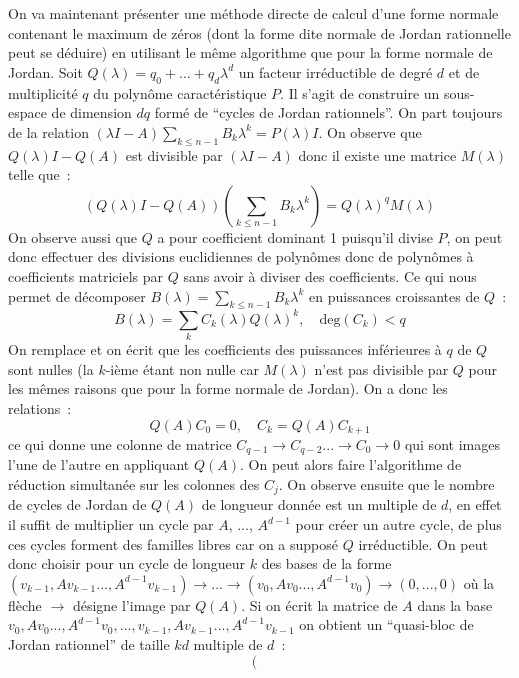 \documentclass[a4paper,11pt]{article}
\begin{document}
\begin{giacjshere}
On va maintenant pr\'esenter une m\'ethode directe de calcul d'une forme normale
contenant le maximum de z\'eros (dont la forme dite normale de Jordan
rationnelle peut se d\'eduire) en utilisant le m\^eme algorithme que pour 
la forme
normale de Jordan. Soit $Q(\lambda)=q_0+...+q_d \lambda^d$ 
un facteur irr\'eductible
de degr\'e $d$ et de multiplicit\'e $q$ 
du polyn\^ome caract\'eristique $P$. Il
s'agit de construire un sous-espace de dimension $dq$ form\'e de ``cycles
de Jordan rationnels''.
On part toujours de la relation 
$(\lambda I -A) \sum_{k\leq n-1} B_k \lambda^k=P(\lambda)I$.
On observe que $Q(\lambda)I-Q(A)$ est divisible par $(\lambda I -A) $
donc il existe une matrice $M(\lambda)$ telle que~:
\[ (Q(\lambda) I -Q(A)) (\sum_{k\leq n-1} B_k \lambda^k)
=Q(\lambda)^q M(\lambda) \]
On observe aussi que $Q$ a pour coefficient dominant 1 puisqu'il divise
$P$, on peut donc effectuer des divisions euclidiennes de polyn\^omes
donc de polyn\^omes \`a coefficients matriciels par $Q$ sans avoir
\`a diviser des coefficients. Ce qui nous
permet de d\'ecomposer $B(\lambda)=\sum_{k\leq n-1} B_k \lambda^k$ en 
puissances croissantes de $Q$~:
\[ B(\lambda)=\sum_k C_k(\lambda) Q(\lambda)^k, \quad \mbox{deg}(C_k)<q \]
On remplace et on \'ecrit que les coefficients des puissances inf\'erieures
\`a $q$ de $Q$ sont nulles (la $k$-i\`eme \'etant non nulle
car $M(\lambda)$ n'est pas divisible par $Q$ pour les m\^emes raisons
que pour la forme normale de Jordan). On a donc les relations~:
\[ Q(A)C_0 = 0, \quad C_k = Q(A) C_{k+1} \]
ce qui donne une colonne de matrice 
$C_{q-1} \rightarrow C_{q-2} ... \rightarrow C_0 \rightarrow 0$
qui sont images l'une de l'autre en appliquant $Q(A)$. On peut alors
faire l'algorithme de r\'eduction simultan\'ee sur les colonnes des $C_j$. 
On observe
ensuite que le nombre de cycles de Jordan de $Q(A)$ de longueur donn\'ee 
est un multiple de $d$, en effet il suffit de multiplier
un cycle par $A$, ..., $A^{d-1}$ pour cr\'eer un autre cycle, de plus ces
cycles forment des familles libres car on a suppos\'e $Q$ irr\'eductible.
On peut donc choisir pour un cycle de longueur $k$ des bases de la forme
$(v_{k-1},Av_{k-1}...,A^{d-1}v_{k-1}) \rightarrow ... 
\rightarrow (v_{0},Av_{0}...,A^{d-1}v_{0}) \rightarrow (0,...,0) $
o\`u la fl\`eche $\rightarrow$ d\'esigne l'image par $Q(A)$.
Si on \'ecrit la matrice de $A$ dans la base 
$v_{0},Av_{0}...,A^{d-1}v_{0},...,v_{k-1},Av_{k-1}...,A^{d-1}v_{k-1}$
on obtient un ``quasi-bloc de Jordan rationnel'' de taille $kd$ 
multiple de $d$~:
\[ 
\left( \begin{array}{cccccccccc}

\end{array}\]
\end{giacjshere}
\end{document}
